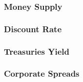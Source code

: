 \subsubsection{Money Supply \label{sec:MS}}
\subsubsection{Discount Rate \label{sec:rates}}
\subsubsection{Treasuries Yield \label{sec:Treasuries}}
\subsubsection{Corporate Spreads \label{sec:spreads}}


